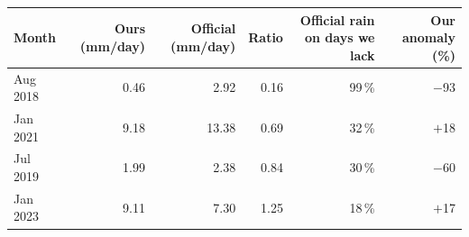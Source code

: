 \begin{tabular}{lrrrrr}
\toprule
Month & Ours (mm/day) & Official (mm/day) & Ratio & Official rain on days we lack & Our anomaly (\%) \\
\midrule
Aug 2018 & 0.46 & 2.92 & 0.16 & 99\,\% & $-$93 \\
Jan 2021 & 9.18 & 13.38 & 0.69 & 32\,\% & $+$18 \\
Jul 2019 & 1.99 & 2.38 & 0.84 & 30\,\% & $-$60 \\
Jan 2023 & 9.11 & 7.30 & 1.25 & 18\,\% & $+$17 \\
\bottomrule
\end{tabular}
